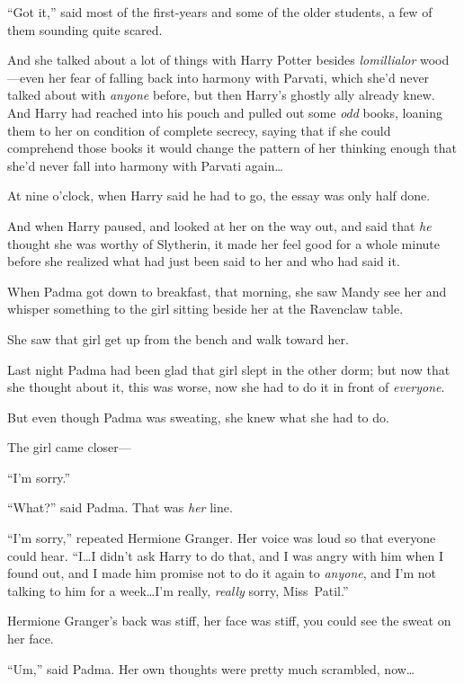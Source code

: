 “Got it,” said most of the first-years and some of the older students, a few of them sounding quite scared.

\later

And she talked about a lot of things with Harry Potter besides \emph{lomillialor} wood—even her fear of falling back into harmony with Parvati, which she’d never talked about with \emph{anyone} before, but then Harry’s ghostly ally already knew. And Harry had reached into his pouch and pulled out some \emph{odd} books, loaning them to her on condition of complete secrecy, saying that if she could comprehend those books it would change the pattern of her thinking enough that she’d never fall into harmony with Parvati again…

At nine o’clock, when Harry said he had to go, the essay was only half done.

And when Harry paused, and looked at her on the way out, and said that \emph{he} thought she was worthy of Slytherin, it made her feel good for a whole minute before she realized what had just been said to her and who had said it.

\later

When Padma got down to breakfast, that morning, she saw Mandy see her and whisper something to the girl sitting beside her at the Ravenclaw table.

She saw that girl get up from the bench and walk toward her.

Last night Padma had been glad that girl slept in the other dorm; but now that she thought about it, this was worse, now she had to do it in front of \emph{everyone}.

But even though Padma was sweating, she knew what she had to do.

The girl came closer—

“I’m sorry.”

“What?” said Padma. That was \emph{her} line.

“I’m sorry,” repeated Hermione Granger. Her voice was loud so that everyone could hear. “I…I didn’t ask Harry to do that, and I was angry with him when I found out, and I made him promise not to do it again to \emph{anyone}, and I’m not talking to him for a week…I’m really, \emph{really} sorry, Miss~Patil.”

Hermione Granger’s back was stiff, her face was stiff, you could see the sweat on her face.

“Um,” said Padma. Her own thoughts were pretty much scrambled, now…


